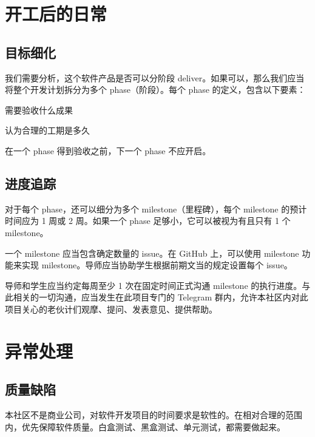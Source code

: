 \documentclass[a4paper,11pt]{article}
\begin{document}
\section{开工后的日常}

\subsection{目标细化}

我们需要分析，这个软件产品是否可以分阶段 deliver。如果可以，那么我们应当将整个开发计划拆分为多个 phase（阶段）。每个 phase 的定义，包含以下要素：

\begin{compactitem}
    \item 需要验收什么成果
    \item 认为合理的工期是多久
\end{compactitem}

在一个 phase 得到验收之前，下一个 phase 不应开启。

\subsection{进度追踪}

对于每个 phase，还可以细分为多个 milestone（里程碑），每个 milestone 的预计时间应为 1 周或 2 周。如果一个 phase 足够小，它可以被视为有且只有 1 个 milestone。

一个 milestone 应当包含确定数量的 issue。在 GitHub 上，可以使用 milestone 功能来实现 milestone。导师应当协助学生根据前期文当的规定设置每个 issue。

导师和学生应当约定每周至少 1 次在固定时间正式沟通 milestone 的执行进度。与此相关的一切沟通，应当发生在此项目专门的 Telegram 群内，允许本社区内对此项目关心的老伙计们观摩、提问、发表意见、提供帮助。











\section{异常处理}

\subsection{质量缺陷}

本社区不是商业公司，对软件开发项目的时间要求是软性的。在相对合理的范围内，优先保障软件质量。白盒测试、黑盒测试、单元测试，都需要做起来。
\end{document}
